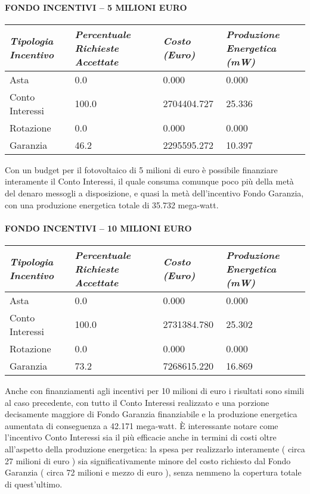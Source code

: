 \documentclass[12pt,a4paper,openright,twoside]{report}
\begin{document}
\paragraph{FONDO INCENTIVI – 5 MILIONI EURO}
\begin{center}
	\begin{tabular}{ | p{3.5cm} | p{3.5cm} | p{3.5cm} | p{3.5cm} | }
		\hline
		\nohyphens{\emph{Tipologia Incentivo}} & \nohyphens{\emph{Percentuale Richieste Accettate}} & \nohyphens{\emph{Costo (Euro)}} & \nohyphens{\emph{Produzione Energetica (mW)}} \\ \hline
		Asta & 0.0 & 0.000 & 0.000 \\ \hline
		Conto Interessi & 100.0 & 2704404.727 & 25.336 \\ \hline
		Rotazione & 0.0 & 0.000 & 0.000 \\ \hline
		Garanzia & 46.2 & 2295595.272 & 10.397 \\
		\hline
	\end{tabular}
\end{center}
Con un budget per il fotovoltaico di 5 milioni di euro è possibile finanziare interamente il Conto Interessi, il quale consuma comunque poco più della metà del denaro messogli a disposizione, e quasi la metà dell'incentivo Fondo Garanzia, con una produzione energetica totale di 35.732 mega-watt.
\paragraph{FONDO INCENTIVI – 10 MILIONI EURO}
\begin{center}
	\begin{tabular}{ | p{3.5cm} | p{3.5cm} | p{3.5cm} | p{3.5cm} | }
		\hline
		\nohyphens{\emph{Tipologia Incentivo}} & \nohyphens{\emph{Percentuale Richieste Accettate}} & \nohyphens{\emph{Costo (Euro)}} & \nohyphens{\emph{Produzione Energetica (mW)}} \\ \hline
		Asta & 0.0 & 0.000 & 0.000 \\ \hline
		Conto Interessi & 100.0 & 2731384.780 & 25.302 \\ \hline
		Rotazione & 0.0 & 0.000 & 0.000 \\ \hline
		Garanzia & 73.2 & 7268615.220 & 16.869 \\
		\hline
	\end{tabular}
\end{center}
Anche con finanziamenti agli incentivi per 10 milioni di euro i risultati sono simili al caso precedente, con tutto il Conto Interessi realizzato e una porzione decisamente maggiore di Fondo Garanzia finanziabile e la produzione energetica aumentata di conseguenza a 42.171 mega-watt.
È interessante notare come l'incentivo Conto Interessi sia il più efficacie anche in termini di costi oltre all'aspetto della produzione energetica: la spesa per realizzarlo interamente ( circa 27 milioni di euro ) sia significativamente minore del costo richiesto dal Fondo Garanzia ( circa 72 milioni e mezzo di euro ), senza nemmeno la copertura totale di quest'ultimo.
\end{document}

